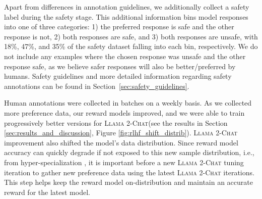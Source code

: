\documentclass{article}
\newcommand{\modelname}{\textsc{Llama 2-Chat}\xspace}
\begin{document}
Apart from differences in annotation guidelines, we additionally collect a safety label during the safety stage. This additional information bins model responses into one of three categories: 1) the preferred response is safe and the other response is not, 2) both responses are safe, and 3) both responses are unsafe, with 18\%, 47\%, and 35\% of the safety dataset falling into each bin, respectively. We do not include any examples where the chosen response was unsafe and the other response safe, as we believe safer responses will also be better/preferred by humans. Safety guidelines and more detailed information regarding safety annotations can be found in Section~\ref{sec:safety_guidelines}.

Human annotations were collected in batches on a weekly basis.
As we collected more preference data, our reward models improved, and we were able to train progressively better versions for \modelname (see the results in Section \ref{sec:results_and_discussion}, Figure \ref{fig:rlhf_shift_distrib}). 
\modelname improvement also shifted the model's data distribution. Since reward model accuracy can quickly degrade if not exposed to this new sample distribution, i.e., from hyper-specialization \citep{scialom2020coldgans}, it is important before a new \modelname tuning iteration to gather new preference data using the latest \modelname iterations. This step helps keep the reward model on-distribution and maintain an accurate reward for the latest model.
\end{document}
